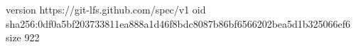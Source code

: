 version https://git-lfs.github.com/spec/v1
oid sha256:0df0a5bf203733811ea888a1d46f8bdc8087b86bf6566202bea5d1b325066ef6
size 922
